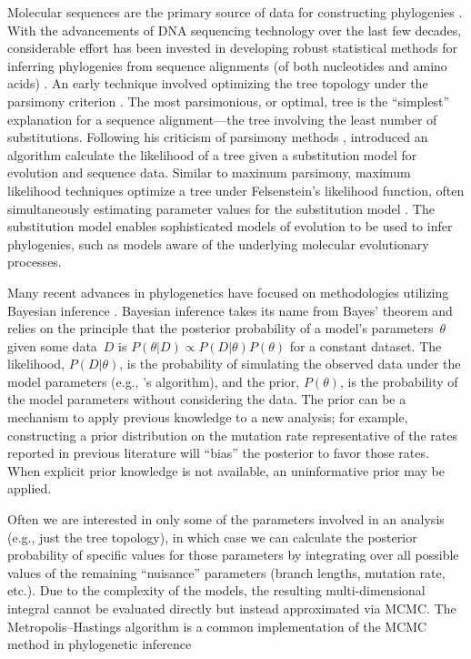\documentclass[12pt,letterpaper]{article}
\begin{document}
Molecular sequences are the primary source of data for constructing phylogenies \parencite{Baum:2008}. With the advancements of DNA sequencing technology over the last few decades, considerable effort has been invested in developing robust statistical methods for inferring phylogenies from sequence alignments (of both nucleotides and amino acids) \parencite{Felsenstein:2005}. An early technique involved optimizing the tree topology under the parsimony criterion \parencite{Fitch:1971}. The most parsimonious, or optimal, tree is the \enquote{simplest} explanation for a sequence alignment---the tree involving the least number of substitutions. Following his criticism of parsimony methods \parencite{Felsenstein:1978}, \textcite{Felsenstein:1981} introduced an algorithm calculate the likelihood of a tree given a substitution model for evolution and sequence data. Similar to maximum parsimony, maximum likelihood techniques optimize a tree under Felsenstein's likelihood function, often simultaneously estimating parameter values for the substitution model \parencite{Felsenstein:2005}. The substitution model enables sophisticated models of evolution to be used to infer phylogenies, such as models aware of the underlying molecular evolutionary processes.

Many recent advances in phylogenetics have focused on methodologies utilizing Bayesian inference \parencites{Ronquist:2012}{Drummond:2012}. Bayesian inference takes its name from Bayes' theorem \parencite{Bayes:1763} and relies on the principle that the posterior probability of a model's parameters~$\theta$ given some data~$D$ is $P\left(\theta|D\right) \propto P\left(D|\theta\right) P\left(\theta\right)$ for a constant dataset. The likelihood, $P\left(D|\theta\right)$, is the probability of simulating the observed data under the model parameters (e.g., \citeauthor{Felsenstein:1981}'s \citeyear{Felsenstein:1981} algorithm), and the prior, $P\left(\theta\right)$, is the probability of the model parameters without considering the data. The prior can be a mechanism to apply previous knowledge to a new analysis; for example, constructing a prior distribution on the mutation rate representative of the rates reported in previous literature will \enquote{bias} the posterior to favor those rates. When explicit prior knowledge is not available, an uninformative prior may be applied.

Often we are interested in only some of the parameters involved in an analysis (e.g., just the tree topology), in which case we can calculate the posterior probability of specific values for those parameters by integrating over all possible values of the remaining \enquote{nuisance} parameters (branch lengths, mutation rate, etc.). Due to the complexity of the models, the resulting multi-dimensional integral cannot be evaluated directly but instead approximated via \ac{MCMC}. The Metropolis--Hastings algorithm \parencites{Metropolis:1953}{Hastings:1970} is a common implementation of the \ac{MCMC} method in phylogenetic inference
\end{document}
